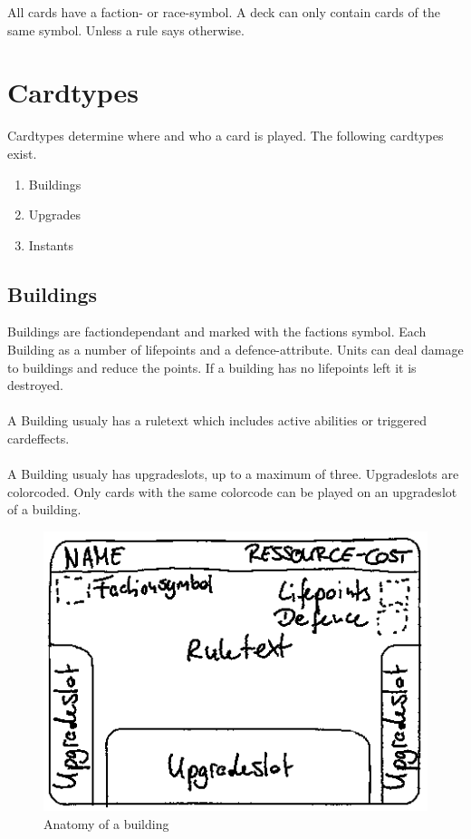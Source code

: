 \documentclass[a5paper,pagesize,10pt,bibtotoc,pointlessnumbers,
normalheadings,DIV=9,twoside=false]{scrbook}
\begin{document}
All cards have a faction- or race-symbol. A deck can only contain cards of the same symbol. Unless a rule says otherwise.

\section{Cardtypes}
Cardtypes determine where and who a card is played. The following cardtypes exist.

\begin{enumerate}
\item Buildings
\item Upgrades
\item Instants
\end{enumerate}

\subsection{Buildings}
Buildings are factiondependant and marked with the factions symbol. Each Building as a number of lifepoints and a defence-attribute.
Units can deal damage to buildings and reduce the points. If a building has no lifepoints left it is destroyed.\\
\\
A Building usualy has a ruletext which includes active abilities or triggered cardeffects.\\
\\
A Building usualy has upgradeslots, up to a maximum of three.
Upgradeslots are colorcoded. Only cards with the same colorcode can be played on an upgradeslot of a building.

\begin{figure}[t]
\includegraphics[scale=0.6]{Building}
\centering
\caption{Anatomy of a building}
\end{figure}
\end{document}
